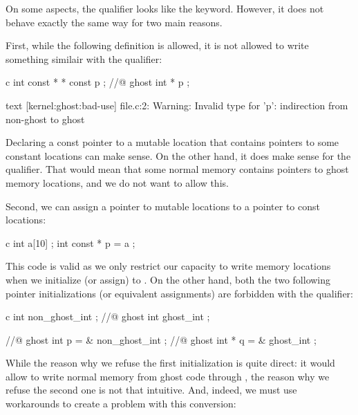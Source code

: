 

On some aspects, the  qualifier
looks like the  keyword. However, it does not
behave exactly the same way for two main reasons.


First, while the following  definition is allowed,
it is not allowed to write something similair with the
 qualifier:


\begin{CodeBlock}{c}
int const * * const p ;
//@ ghost int \ghost * * p ;
\end{CodeBlock}


\begin{CodeBlock}{text}
[kernel:ghost:bad-use] file.c:2: Warning:
  Invalid type for 'p': indirection from non-ghost to ghost
\end{CodeBlock}


Declaring a const pointer to a mutable location that contains pointers
to some constant locations can make sense. On the other hand, it does
make sense for the  qualifier. That
would mean that some normal memory contains pointers to ghost memory
locations, and we do not want to allow this.


Second, we can assign a pointer to mutable locations to a pointer to
const locations:


\begin{CodeBlock}{c}
int a[10] ;
int const * p = a ;
\end{CodeBlock}


This code is valid as we only restrict our capacity to write memory
locations when we initialize (or assign)  to .
On the other hand, both the two following pointer initializations
(or equivalent assignments) are forbidden with the
 qualifier:


\begin{CodeBlock}{c}
int non_ghost_int ;
//@ ghost int ghost_int ;

//@ ghost int \ghost * p = & non_ghost_int ;
//@ ghost int * q = & ghost_int ;
\end{CodeBlock}


While the reason why we refuse the first initialization is quite direct:
it would allow to write normal memory from ghost code through
, the reason why we refuse the second one is not that
intuitive. And, indeed, we must use workarounds to create a problem with
this conversion:


